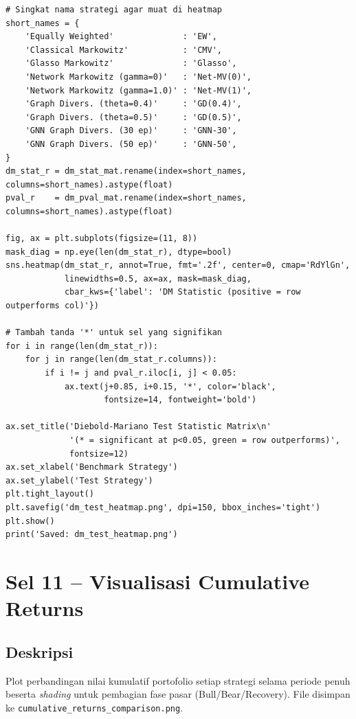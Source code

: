 \documentclass[12pt,a4paper]{article}
\begin{document}
\begin{lstlisting}[caption={Heatmap DM test}]
# Singkat nama strategi agar muat di heatmap
short_names = {
    'Equally Weighted'              : 'EW',
    'Classical Markowitz'           : 'CMV',
    'Glasso Markowitz'              : 'Glasso',
    'Network Markowitz (gamma=0)'   : 'Net-MV(0)',
    'Network Markowitz (gamma=1.0)' : 'Net-MV(1)',
    'Graph Divers. (theta=0.4)'     : 'GD(0.4)',
    'Graph Divers. (theta=0.5)'     : 'GD(0.5)',
    'GNN Graph Divers. (30 ep)'     : 'GNN-30',
    'GNN Graph Divers. (50 ep)'     : 'GNN-50',
}
dm_stat_r = dm_stat_mat.rename(index=short_names, columns=short_names).astype(float)
pval_r    = dm_pval_mat.rename(index=short_names, columns=short_names).astype(float)

fig, ax = plt.subplots(figsize=(11, 8))
mask_diag = np.eye(len(dm_stat_r), dtype=bool)
sns.heatmap(dm_stat_r, annot=True, fmt='.2f', center=0, cmap='RdYlGn',
            linewidths=0.5, ax=ax, mask=mask_diag,
            cbar_kws={'label': 'DM Statistic (positive = row outperforms col)'})

# Tambah tanda '*' untuk sel yang signifikan
for i in range(len(dm_stat_r)):
    for j in range(len(dm_stat_r.columns)):
        if i != j and pval_r.iloc[i, j] < 0.05:
            ax.text(j+0.85, i+0.15, '*', color='black',
                    fontsize=14, fontweight='bold')

ax.set_title('Diebold-Mariano Test Statistic Matrix\n'
             '(* = significant at p<0.05, green = row outperforms)',
             fontsize=12)
ax.set_xlabel('Benchmark Strategy')
ax.set_ylabel('Test Strategy')
plt.tight_layout()
plt.savefig('dm_test_heatmap.png', dpi=150, bbox_inches='tight')
plt.show()
print('Saved: dm_test_heatmap.png')
\end{lstlisting}

\section{Sel 11 -- Visualisasi Cumulative Returns}

\subsection{Deskripsi}
Plot perbandingan nilai kumulatif portofolio setiap strategi selama periode penuh
beserta \textit{shading} untuk pembagian fase pasar (Bull/Bear/Recovery).
File disimpan ke \texttt{cumulative\_returns\_comparison.png}.
\end{document}

